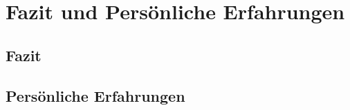 



\chapter{Fazit und Persönliche Erfahrungen}


\section{Fazit}


\section{Persönliche Erfahrungen}
